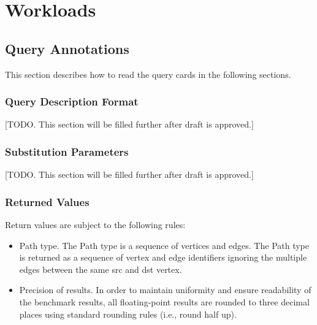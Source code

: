 \chapter{Workloads}
\label{sec:workloads}

\section{Query Annotations}

This section describes how to read the query cards in the following sections.
\subsection{Query Description Format}
\label{subsec:query-description-format}
 [TODO. This section will be filled further after draft is approved.]


\subsection{Substitution Parameters}
\label{subsec:substitution-parameters}
 [TODO. This section will be filled further after draft is approved.]


\subsection{Returned Values}
\label{subsec:returned-values}

Return values are subject to the following rules:
\begin{itemize}
    \item Path type. The Path type is a sequence of vertices and edges. The
          Path type is returned as a sequence of vertex and edge identifiers
          ignoring the multiple edges between the same src and dst vertex.
	\item Precision of results. In order to maintain uniformity and ensure 
		  readability of the benchmark results, all floating-point results are 
		  rounded to three decimal places using standard rounding rules (i.e., round half up).  
\end{itemize}

